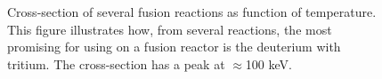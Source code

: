 
\begin{figure}[H]
		\centering
		\caption{Cross-section of several fusion reactions as function of temperature. This figure illustrates how, from several reactions, the most promising for using on a fusion
reactor is the deuterium with tritium. The cross-section has a peak at $\approx$100 keV. }
		\label{fig:Fusion_CrossSections}
\end{figure}
